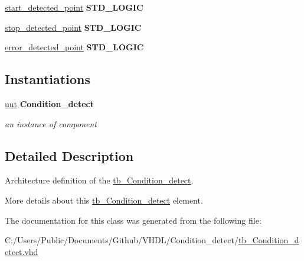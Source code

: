 \begin{DoxyCompactItemize}
\item 
\hyperlink{classtb___condition__detect_1_1_behavioral_a6c4fa610c9bff0792d9cf7c032499f37}{start\+\_\+detected\+\_\+point} {\bfseries \textcolor{vhdlchar}{S\+T\+D\+\_\+\+L\+O\+G\+IC}\textcolor{vhdlchar}{ }} \hypertarget{classtb___condition__detect_1_1_behavioral_a6c4fa610c9bff0792d9cf7c032499f37}{}\label{classtb___condition__detect_1_1_behavioral_a6c4fa610c9bff0792d9cf7c032499f37}

\item 
\hyperlink{classtb___condition__detect_1_1_behavioral_a3db5a0025370aa1f80b610cf73a1b69c}{stop\+\_\+detected\+\_\+point} {\bfseries \textcolor{vhdlchar}{S\+T\+D\+\_\+\+L\+O\+G\+IC}\textcolor{vhdlchar}{ }} \hypertarget{classtb___condition__detect_1_1_behavioral_a3db5a0025370aa1f80b610cf73a1b69c}{}\label{classtb___condition__detect_1_1_behavioral_a3db5a0025370aa1f80b610cf73a1b69c}

\item 
\hyperlink{classtb___condition__detect_1_1_behavioral_a5f0bc9b8a27ae8e92344c14c2869dd63}{error\+\_\+detected\+\_\+point} {\bfseries \textcolor{vhdlchar}{S\+T\+D\+\_\+\+L\+O\+G\+IC}\textcolor{vhdlchar}{ }} \hypertarget{classtb___condition__detect_1_1_behavioral_a5f0bc9b8a27ae8e92344c14c2869dd63}{}\label{classtb___condition__detect_1_1_behavioral_a5f0bc9b8a27ae8e92344c14c2869dd63}

\end{DoxyCompactItemize}
\subsection*{Instantiations}
 \begin{DoxyCompactItemize}
\item 
\hyperlink{classtb___condition__detect_1_1_behavioral_a1619316ad715601eb5d3559db829ac05}{uut}  {\bfseries Condition\+\_\+detect}   \hypertarget{classtb___condition__detect_1_1_behavioral_a1619316ad715601eb5d3559db829ac05}{}\label{classtb___condition__detect_1_1_behavioral_a1619316ad715601eb5d3559db829ac05}

\begin{DoxyCompactList}\small\item\em an instance of component \end{DoxyCompactList}\end{DoxyCompactItemize}


\subsection{Detailed Description}
Architecture definition of the \hyperlink{classtb___condition__detect}{tb\+\_\+\+Condition\+\_\+detect}. 

More details about this \hyperlink{classtb___condition__detect}{tb\+\_\+\+Condition\+\_\+detect} element. 

The documentation for this class was generated from the following file\+:\begin{DoxyCompactItemize}
\item 
C\+:/\+Users/\+Public/\+Documents/\+Github/\+V\+H\+D\+L/\+Condition\+\_\+detect/\hyperlink{tb___condition__detect_8vhd}{tb\+\_\+\+Condition\+\_\+detect.\+vhd}\end{DoxyCompactItemize}
